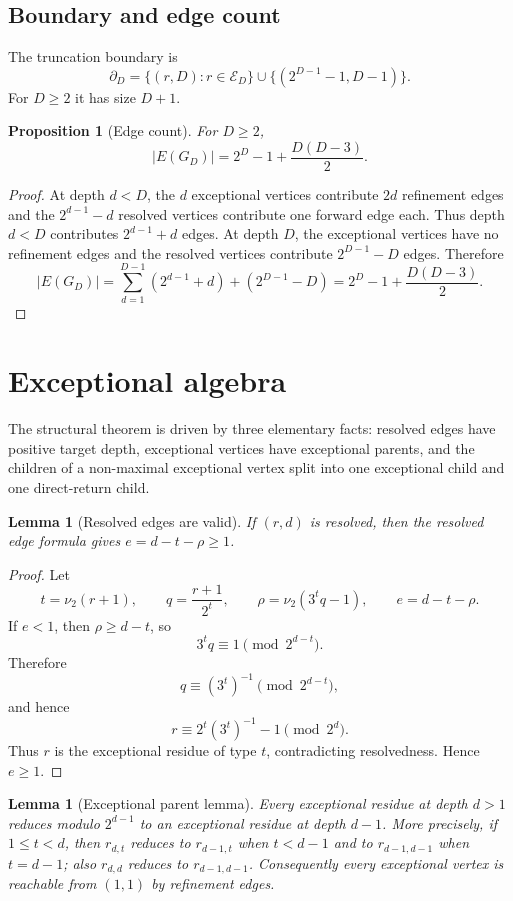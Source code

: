 \documentclass[11pt]{article}
\newtheorem{proposition}[theorem]{Proposition}
\newtheorem{lemma}[theorem]{Lemma}
\theoremstyle{definition}
\theoremstyle{remark}
\newcommand{\nuu}{\nu_2}
\newcommand{\Ecal}{\mathcal E}
\newcommand{\bdD}{\partial_D}
\begin{document}
\subsection{Boundary and edge count}

The truncation boundary is
\[
\bdD=
\{(r,D):r\in\Ecal_D\}
\cup
\{(2^{D-1}-1,D-1)\}.
\]
For $D\ge2$ it has size $D+1$.

\begin{proposition}[Edge count]\label{prop:edge-count}
For $D\ge2$,
\[
|E(G_D)|=2^D-1+\frac{D(D-3)}2.
\]
\end{proposition}

\begin{proof}
At depth $d<D$, the $d$ exceptional vertices contribute $2d$ refinement edges and the $2^{d-1}-d$ resolved vertices contribute one forward edge each.  Thus depth $d<D$ contributes $2^{d-1}+d$ edges.  At depth $D$, the exceptional vertices have no refinement edges and the resolved vertices contribute $2^{D-1}-D$ edges.  Therefore
\[
|E(G_D)|=
\sum_{d=1}^{D-1}(2^{d-1}+d)+(2^{D-1}-D)
=2^D-1+\frac{D(D-3)}2.
\]
\end{proof}

\section{Exceptional algebra}\label{sec:exceptional}

The structural theorem is driven by three elementary facts: resolved edges have positive target depth, exceptional vertices have exceptional parents, and the children of a non-maximal exceptional vertex split into one exceptional child and one direct-return child.

\begin{lemma}[Resolved edges are valid]\label{lem:resolved-valid}
If $(r,d)$ is resolved, then the resolved edge formula gives $e=d-t-\rho\ge1$.
\end{lemma}

\begin{proof}
Let
\[
t=\nuu(r+1),
\qquad
q=\frac{r+1}{2^t},
\qquad
\rho=\nuu(3^tq-1),
\qquad
e=d-t-\rho.
\]
If $e<1$, then $\rho\ge d-t$, so
\[
3^tq\equiv1\pmod {2^{d-t}}.
\]
Therefore
\[
q\equiv(3^t)^{-1}\pmod {2^{d-t}},
\]
and hence
\[
r\equiv2^t(3^t)^{-1}-1\pmod {2^d}.
\]
Thus $r$ is the exceptional residue of type $t$, contradicting resolvedness.  Hence $e\ge1$.
\end{proof}

\begin{lemma}[Exceptional parent lemma]\label{lem:parent}
Every exceptional residue at depth $d>1$ reduces modulo $2^{d-1}$ to an exceptional residue at depth $d-1$.  More precisely, if $1\le t<d$, then $r_{d,t}$ reduces to $r_{d-1,t}$ when $t<d-1$ and to $r_{d-1,d-1}$ when $t=d-1$; also $r_{d,d}$ reduces to $r_{d-1,d-1}$.
Consequently every exceptional vertex is reachable from $(1,1)$ by refinement edges.
\end{lemma}
\end{document}
